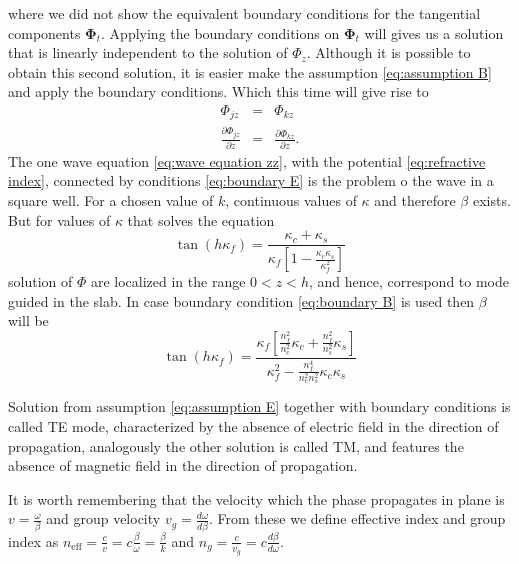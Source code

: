 \documentclass[12pt,twoside,english]{book}
\renewcommand{\~}{\perispomeni}%
\numberwithin{equation}{section}
\numberwithin{figure}{section}
\begin{document}
where we did not show the equivalent boundary conditions for the tangential components $\mathbf{\Phi}_{t}$. Applying the boundary conditions on $\mathbf{\Phi}_{t}$ will gives us a solution that is linearly independent to the solution of $\Phi_{z}$. Although it is possible to obtain this second solution, it is easier make the assumption \ref{eq:assumption B} and apply the boundary conditions. Which this time will give rise to
\begin{subequations}
\begin{eqnarray}
\Phi_{jz} & = & \Phi_{kz}\label{eq:boundary Bz}\\
\frac{\partial\Phi_{jz}}{\partial z} & = & \frac{\partial\Phi_{kz}}{\partial z}.\label{eq:boundary dBz}\end{eqnarray}
\label{eq:boundary B}\end{subequations}
The one wave equation \ref{eq:wave equation zz}, with the potential \ref{eq:refractive index}, connected by conditions \ref{eq:boundary E} is the problem o the wave in a square well. For a chosen value of $k$, continuous values of $\kappa$ and therefore $\beta$ exists. But for values of $\kappa$ that solves the equation
\begin{equation}
\tan\left(h\kappa_{f}\right)=\frac{\kappa_{c}+\kappa_{s}}{\kappa_{f}\left[1-\frac{\kappa_{c}\kappa_{s}}{\kappa_{f}^{2}}\right]}
\end{equation}
solution of $\Phi$ are localized in the range $0<z<h$, and hence, correspond to mode guided in the slab. In case boundary condition \ref{eq:boundary B} is used then $\beta$ will be
\begin{equation}
\tan\left(h\kappa_{f}\right)=\frac{\kappa_{f}\left[\frac{n_{f}^{2}}{n_{c}^{2}}\kappa_{c}+\frac{n_{f}^{2}}{n_{s}^{2}}\kappa_{s}\right]}{\kappa_{f}^{2}-\frac{n_{f}^{4}}{n_{c}^{2}n_{s}^{2}}\kappa_{c}\kappa_{s}}
\end{equation}

Solution from assumption \ref{eq:assumption E} together with boundary conditions \label{eq:boundary E} is called \gls{TE} mode, characterized by the absence of electric field in the direction of propagation, analogously the other solution is called \gls{TM}, and features the absence of magnetic field in the direction of propagation.


It is worth remembering that the velocity which the phase propagates in plane is $v=\frac{\omega}{\beta}$ and group velocity $v_{g}=\frac{d\omega}{d\beta}$. From these we define effective index and group index as $n_{\mbox{eff}}=\frac{c}{v}=c\frac{\beta}{\omega}=\frac{\beta}{k}$ and $n_{g}=\frac{c}{v_{g}}=c\frac{d\beta}{d\omega}$.
\end{document}
